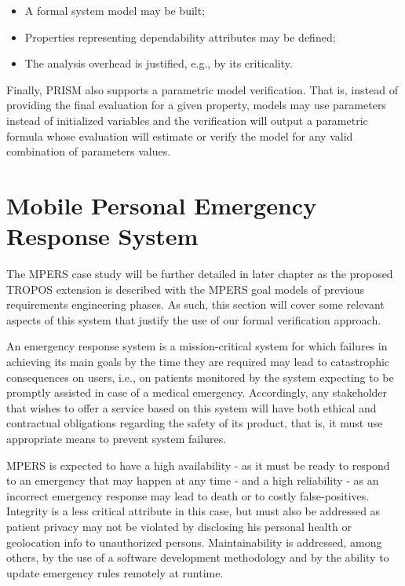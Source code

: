\begin{itemize}

\item A formal system model may be built;
\medskip

\item Properties representing dependability attributes may be defined;
\medskip

\item The analysis overhead is justified, e.g., by its criticality.
\bigskip

\end{itemize}

Finally, PRISM also supports a parametric model verification. That is, instead of providing the final evaluation for a given property, models may use parameters instead of initialized variables and the verification will output a parametric formula whose evaluation will estimate or verify the model for any valid combination of parameters values.

\section{Mobile Personal Emergency Response System}

The MPERS case study will be further detailed in later chapter as the proposed TROPOS extension is described with the MPERS goal models of previous requirements engineering phases. As such, this section will cover some relevant aspects of this system that justify the use of our formal verification approach.

An emergency response system is a mission-critical system for which failures in achieving its main goals by the time they are required may lead to catastrophic consequences on users, i.e., on patients monitored by the system expecting to be promptly assisted in case of a medical emergency. Accordingly, any stakeholder that wishes to offer a service based on this system will have both ethical and contractual obligations regarding the safety of its product, that is, it must use appropriate means to prevent system failures.

MPERS is expected to have a high availability - as it must be ready to respond to an emergency that may happen at any time - and a high reliability - as an incorrect emergency response may lead to death or to costly false-positives. Integrity is a less critical attribute in this case, but must also be addressed as patient privacy may not be violated by disclosing his personal health or geolocation info to unauthorized persons. Maintainability is addressed, among others, by the use of a software development methodology and by the ability to update emergency rules remotely at runtime.


